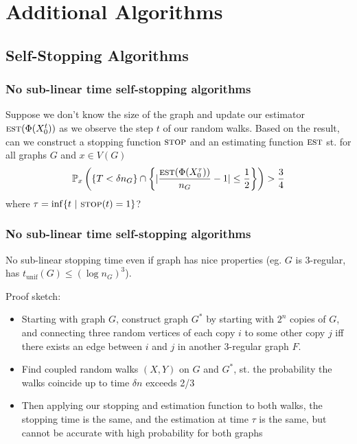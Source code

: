 \documentclass{beamer}
\newcommand{\Prob}{\mathbb{P}}
\newcommand{\Est}{\textsc{est}}
\newcommand{\Stop}{\textsc{stop}}
\begin{document}
\section{Additional Algorithms}
\subsection{Self-Stopping Algorithms}
\begin{frame}
\frametitle{No sub-linear time self-stopping algorithms}

Suppose we don't know the size of the graph and update our estimator $\Est(\Phi(X_0^t))$ as we observe the step $t$ of our random walks. Based on the result, can we construct a stopping function $\Stop$ and an estimating function $\Est$ st. for all graphs $G$ and $x\in V(G)$
\[
\Prob_x\left(\{T<\delta n_G\}\cap \left\{|\frac{\Est(\Phi(X_0^\tau))}{n_G}-1|\leq \frac12\right\}\right)>\frac34
\]
where $\tau = \inf \{t\ |\ \Stop(t) = 1\}$?

\end{frame}

\begin{frame}
\frametitle{No sub-linear time self-stopping algorithms}

No sub-linear stopping time even if graph has nice properties (eg. $G$ is 3-regular, has $t_{\text{unif}}(G)\leq (\log n_G)^3$). 

Proof sketch:
\begin{itemize}
    \item Starting with graph $G$, construct graph $G^*$ by starting with $2^n$ copies of $G$, and connecting three random vertices of each copy $i$ to some other copy $j$ iff there exists an edge between $i$ and $j$ in another 3-regular graph $F$.
    \item Find coupled random walks $(X,Y)$ on $G$ and $G^*$, st. the probability the walks coincide up to time $\delta n$ exceeds 2/3
    \item Then applying our stopping and estimation function to both walks, the stopping time is the same, and the estimation at time $\tau$ is the same, but cannot be accurate with high probability for both graphs
\end{itemize}

\end{frame}
\end{document}
